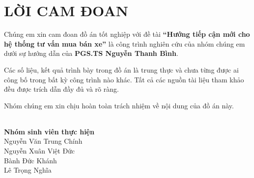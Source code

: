 \clearpage
\chapter*{\centering LỜI CAM ĐOAN}

Chúng em xin cam đoan đồ án tốt nghiệp với đề tài \textbf{``Hướng tiếp cận mới cho hệ thống tư vấn mua bán xe''} là công trình nghiên cứu của nhóm chúng em dưới sự hướng dẫn của \textbf{PGS.TS Nguyễn Thanh Bình}.

Các số liệu, kết quả trình bày trong đồ án là trung thực và chưa từng được ai công bố trong bất kỳ công trình nào khác. Tất cả các nguồn tài liệu tham khảo đều được trích dẫn đầy đủ và rõ ràng.

Nhóm chúng em xin chịu hoàn toàn trách nhiệm về nội dung của đồ án này.

\vspace{1.5cm}

\begin{flushright}
\\[0.5cm]
\textbf{Nhóm sinh viên thực hiện}\\[1cm]
Nguyễn Văn Trung Chính\\
Nguyễn Xuân Việt Đức\\
Bành Đức Khánh\\
Lê Trọng Nghĩa
\end{flushright}

